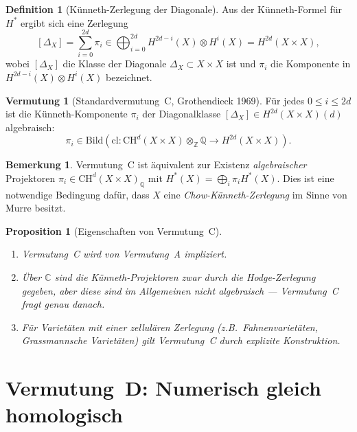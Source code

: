 \documentclass[12pt,a4paper]{amsart}
\newtheorem{proposition}[theorem]{Proposition}
\theoremstyle{definition}
\newtheorem{vermutung}[theorem]{Vermutung}
\newtheorem{bemerkung}[theorem]{Bemerkung}
\newtheorem{definition_de}[theorem]{Definition}
\newcommand{\Z}{\mathbb{Z}}
\newcommand{\Q}{\mathbb{Q}}
\newcommand{\C}{\mathbb{C}}
\newcommand{\CH}{\mathrm{CH}}
\newcommand{\cl}{\mathrm{cl}}
\begin{document}
\begin{definition_de}[Künneth-Zerlegung der Diagonale]
Aus der Künneth-Formel für $H^*$ ergibt sich eine Zerlegung
\[
  [\Delta_X] = \sum_{i=0}^{2d} \pi_i \in \bigoplus_{i=0}^{2d}
  H^{2d-i}(X) \otimes H^i(X) = H^{2d}(X \times X),
\]
wobei $[\Delta_X]$ die Klasse der Diagonale $\Delta_X \subset X \times X$ ist
und $\pi_i$ die Komponente in $H^{2d-i}(X) \otimes H^i(X)$ bezeichnet.
\end{definition_de}

\begin{vermutung}[Standardvermutung~C, Grothendieck 1969]\label{verm:C}
Für jedes $0 \leq i \leq 2d$ ist die Künneth-Komponente $\pi_i$ der
Diagonalklasse $[\Delta_X] \in H^{2d}(X \times X)(d)$ algebraisch:
\[
  \pi_i \in \mathrm{Bild}(\cl: \CH^d(X \times X) \otimes_\Z \Q \to
  H^{2d}(X \times X)).
\]
\end{vermutung}

\begin{bemerkung}
Vermutung~C ist äquivalent zur Existenz \emph{algebraischer} Projektoren
$\pi_i \in \CH^d(X \times X)_\Q$ mit $H^*(X) = \bigoplus_i \pi_i H^*(X)$.
Dies ist eine notwendige Bedingung dafür, dass $X$ eine
\emph{Chow-Künneth-Zerlegung} im Sinne von Murre besitzt.
\end{bemerkung}

\begin{proposition}[Eigenschaften von Vermutung~C]
\begin{enumerate}[label=(\roman*)]
  \item Vermutung~C wird von Vermutung~A impliziert.
  \item Über $\C$ sind die Künneth-Projektoren zwar durch die Hodge-Zerlegung
        gegeben, aber diese sind im Allgemeinen \emph{nicht} algebraisch ---
        Vermutung~C fragt genau danach.
  \item Für Varietäten mit einer zellulären Zerlegung (z.B.\ Fahnenvarietäten,
        Grassmannsche Varietäten) gilt Vermutung~C durch explizite Konstruktion.
\end{enumerate}
\end{proposition}

\section{Vermutung~D: Numerisch gleich homologisch}\label{sec:vermutungD}
\end{document}
